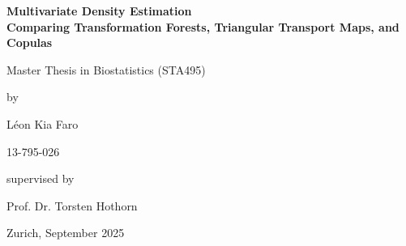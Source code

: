 \begin{titlepage}
\thispagestyle{empty}
\renewcommand\familydefault{\sfdefault}
\renewcommand{\baselinestretch}{1.5}\normalfont
\begin{center}
  \setlength{\parindent}{0cm}
  {\bfseries\Large
  Multivariate Density Estimation\\
  Comparing Transformation Forests, Triangular Transport Maps, and Copulas\par}

  \vspace{2mm}
  \hrulefill

  \vspace*{4cm}

  {\large Master Thesis in Biostatistics (STA495)\par}

  \vspace*{12mm}
  by

  \vspace*{12mm}
  Léon Kia Faro \\
  {\small 13-795-026\par}

  \vspace*{4cm}
  supervised by

  \vspace*{12mm}
  Prof. Dr. Torsten Hothorn

  \vfill
  Zurich, September 2025 
\end{center}
\renewcommand\familydefault{\rmdefault}
\renewcommand{\baselinestretch}{1.0}\rmfamily
\setcounter{page}{0}
\end{titlepage}
\restoregeometry
\cleardoublepage

